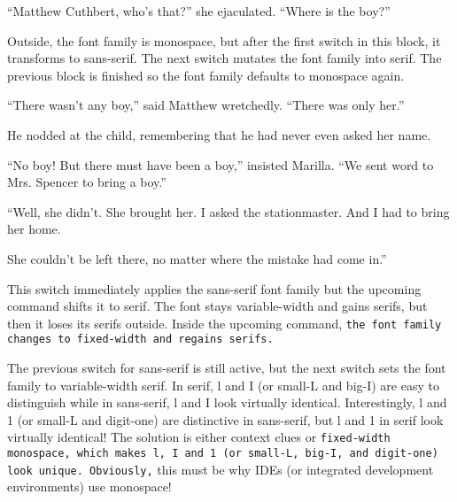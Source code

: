 \documentclass[a4paper]{article}
\begin{document}
``Matthew Cuthbert, who's that?'' she ejaculated. ``Where is the boy?''


{Outside, the font family is monospace, \sffamily but after the first switch in this block, it transforms to sans-serif. \rmfamily The next switch mutates the font family into serif.} The previous block is finished so the font family defaults to monospace again.

{``There wasn't any boy,'' said Matthew wretchedly. \rmfamily ``There was only her.''

He nodded at the child, remembering that he had never even asked her name.

``No boy! \sffamily But there must have been a boy,'' insisted Marilla. ``We sent word to Mrs. Spencer to bring a boy.''

``Well, she didn't. She brought her. I asked the stationmaster. And I had to bring her home.} She couldn't be left there, no matter where the mistake had come in.''

\sffamily This switch immediately applies the sans-serif font family but the upcoming command \textrm{shifts it to serif. The font stays variable-width and gains serifs,} but then it loses its serifs outside. Inside the upcoming command, \texttt{the font family changes to fixed-width and regains serifs.}

The previous switch for sans-serif is still active, but the next switch \rmfamily sets the font family to variable-width serif. In serif, l and I (or small-L and big-I) are easy to distinguish while \textsf{in sans-serif, l and I look virtually identical. Interestingly, l and 1 (or small-L and digit-one) are distinctive in sans-serif,} but l and 1 in serif look virtually identical! The solution is either context clues or \texttt{fixed-width monospace, which makes l, I and 1 (or small-L, big-I, and digit-one) look unique. Obviously,} this must be why IDEs (or integrated development environments) use monospace!
\end{document}
